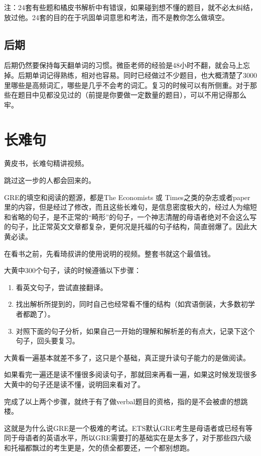 \documentclass[cn,plain]{elegantbookex}
\newenvironment{material}{\begin{tcolorbox}[title={材料}]}{\end{tcolorbox}}
\begin{document}
注：24套有些题和橘皮书解析中有错误，如果碰到想不懂的题目，就不必太纠结，放过他。24套的目的在于巩固单词意思和考法，而不是教你怎么做填空。

\subsection{后期}
后期仍然要保持每天翻单词的习惯。微臣老师的经验是48小时不翻，就会马上忘掉。后期单词记得熟练，相对也容易。同时已经做过不少题目，也大概清楚了3000里哪些是高频词汇，哪些是几乎不会考的词汇。复习的时候可以有所侧重。对于那些在题目中见都没见过的（前提是你要做一定数量的题目），可以不用记得那么牢。

\section{长难句}
\begin{material}
黄皮书，长难句精讲视频。
\end{material}

跳过这一步的人都会回来的。

GRE的填空和阅读的题源，都是The Economists 或
Times之类的杂志或者paper里的内容，但是经过了修改，而且这些长难句，是信息密度极大的，经过人为缩短和省略的句子，是不正常的``畸形''的句子，一个神志清醒的母语者绝对不会这么写的句子，比正常英文文章都复杂，更何况是托福的句子结构，简直弱爆了。因此大黄必读。

在看书之前，先看琦叔讲的使用说明的视频。整套书就这个最值钱。

大黄中300个句子，读的时候遵循以下步骤：

\begin{enumerate}
    \item 看英文句子，尝试直接翻译。
    \item 找出解析所提到的，同时自己也经常看不懂的结构（如宾语倒装，大多数初学者都跪了）。
    \item 对照下面的句子分析，如果自己一开始的理解和解析差的有点大，记录下这个句子，回头要复习。
\end{enumerate}

大黄看一遍基本就差不多了，这只是个基础，真正提升读句子能力的是做阅读。

如果看完一遍还是读不懂很多阅读句子，那就回来再看一遍，如果这时候发现很多大黄中的句子还是读不懂，说明回来看对了。

完成了以上两个步骤，就终于有了做verbal题目的资格，指的是不会被虐的想跳楼。

这就是为什么说GRE是一个极难的考试。ETS默认GRE考生是母语者或已经有等同于母语者的英语水平，所以GRE需要打的基础实在是太多了，对于那些四六级和托福都飘过的考生更是，欠的债全都要还，一个都别想跑。
\end{document}
